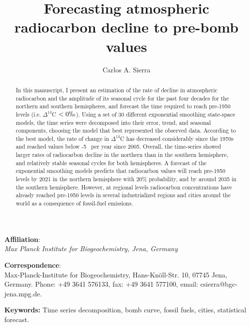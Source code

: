 \documentclass[a4paper, 11pt]{article}
\title{\textbf{Forecasting atmospheric radiocarbon decline to pre-bomb values}}
\author{Carlos A. Sierra}
\date{}
\begin{document}
\maketitle

\vspace{2cm}

\noindent
\textbf{Affiliation}:\\
{\it Max Planck Institute for Biogeochemistry, Jena, Germany}

\vspace{2cm}

\noindent
\textbf{Correspondence}: \\ Max-Planck-Institute for Biogeochemistry, Hans-Kn\"{o}ll-Str. 10, 07745 Jena, Germany. Phone: +49 3641 576133, fax: +49 3641 577100, email: csierra@bgc-jena.mpg.de.

\newpage

\begin{abstract}
In this manuscript, I present an estimation of the rate of decline in atmospheric radiocarbon and the amplitude of its seasonal cycle for the past four decades for the northern and southern hemispheres, and forecast the time required to reach pre-1950 levels (i.e. $\Delta^{14}$C $< 0 \permil$). Using a set of 30 different exponential smoothing state-space models, the time series were decomposed into their error, trend, and seasonal components, choosing the model that best represented the observed data. 
According to the best model, the rate of change in $\Delta^{14}$C has decreased considerably since the 1970s and reached values below -5 \permil \ per year since 2005. Overall, the time-series showed larger rates of radiocarbon decline in the northern than in the southern hemisphere, and relatively stable seasonal cycles for both hemispheres. A forecast of the exponential smoothing models predicts that radiocarbon values will reach pre-1950 levels by 2021 in the northern hemisphere with  20\% probability, and by around 2035 in the southern hemisphere. However, at regional levels radiocarbon concentrations have already reached pre-1950 levels in several industrialized regions and cities around the world as a consequence of fossil-fuel emissions.
\end{abstract}

\textbf{Keywords:} Time series decomposition, bomb curve, fossil fuels, cities, statistical forecast.

\newpage

%
\end{document}
